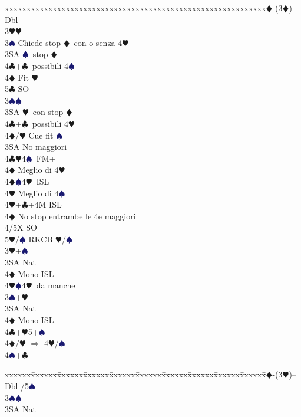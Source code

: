 \documentclass[a4paper,italian]{article}
\newcommand{\BC}{\textcolor{OliveGreen}{$\clubsuit$}}
\newcommand{\BD}{\textcolor{RedOrange}{$\vardiamondsuit$}}
\newcommand{\BH}{\textcolor{Red2}{$\varheartsuit${}}}
\newcommand{\BS}{\textcolor{MidnightBlue}{$\spadesuit${}}}
\newenvironment{bidtable}
{\begin{tabbing}

    xxxxxx\=xxxxxx\=xxxxxx\=xxxxxx\=xxxxxx\=xxxxxx\=xxxxxx\=xxxxxx\=xxxxxx\=xxxxxx\=\kill}
{\end{tabbing} }%
\begin{document}
\begin{multicols}{2}
    \begin{bidtable}
        2\BD-(3\BD)--\+\\
        Dbl\+\\
        3\BH {}\BH \+\\
        3\BS \> Chiede stop \BD\ con o senza 4\BH\\
        3SA \BS\ stop \BD\\
        4\BC {}+\BC\ possibili 4\BS\\
        4\BD \> Fit \BH \\
        5\BC \> SO\-\\
        3\BS {}\BS \+\\
        3SA \BH\ con stop \BD\\
        4\BC {}+\BC\ possibili 4\BH\\
        4\BD/\BH \> Cue fit \BS \-\\
        3SA \> No maggiori\+\\
        4\BC {}\BH 4\BS\ FM+\+\\
        4\BD \> Meglio di 4\BH \-\\
        4\BD {}\BS 4\BH\ ISL\+\\
        4\BH \> Meglio di 4\BS \-\\
        4\BH {}+\BC +4M ISL\-\\
        4\BD\> No stop entrambe le 4e maggiori\+\\
        4/5X \> SO\\
        5\BH/\BS\> RKCB \BH/\BS\-\\
        3\BH {}+\BS \+\\
        3SA \> Nat\+\\
        4\BD \> Mono ISL\\
        4\BH {}\BS 4\BH\ da manche\-\-\\
        3\BS {}+\BH \+\\
        3SA \> Nat\+\\
        4\BD \> Mono ISL\-\-\\
        4\BC {}+\BH5+\BS\\
        4\BD/\BH \> $\Rightarrow$ 4\BH /\BS \\
        4\BS {}+\BC \-
    \end{bidtable}
    \begin{bidtable}
        2\BD-(3\BH)--\+\\
        Dbl /5\BS\ \+\\
        3\BS{}\BS\ \\
        3SA\> Nat\\

\end{bidtable}
\end{multicols}
\end{document}
